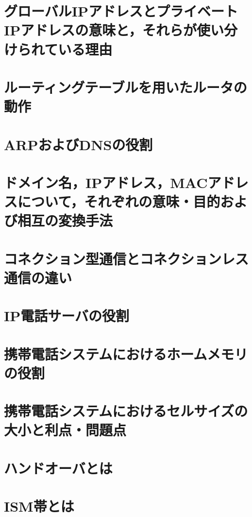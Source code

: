 \documentclass[10.5pt]{jsarticle}
\begin{document}
\section{グローバルIPアドレスとプライベートIPアドレスの意味と，それらが使い分けられている理由}



\section{ルーティングテーブルを用いたルータの動作}



\section{ARPおよびDNSの役割}



\section{ドメイン名，IPアドレス，MACアドレスについて，それぞれの意味・目的および相互の変換手法}



\section{コネクション型通信とコネクションレス通信の違い}


\section{IP電話サーバの役割}


\section{携帯電話システムにおけるホームメモリの役割}


\section{携帯電話システムにおけるセルサイズの大小と利点・問題点}


\section{ハンドオーバとは}


\section{ISM帯とは}
\end{document}
